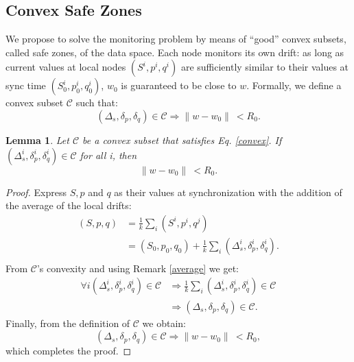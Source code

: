 \documentclass{sig-alternate-05-2015}
\newtheorem{lemma}{Lemma}
\begin{document}
\subsection{Convex Safe Zones}
We propose to solve the monitoring problem by means of
``good'' convex subsets, called safe zones, of the data space.
Each node monitors its own drift: as long as current values
at local nodes $(S^i,p^i,q^i)$ are sufficiently similar to their values
at sync time $(S^i_0,p^i_0,q^i_0)$, $w_0$ is guaranteed to be close to $w$.
Formally, we define a convex subset $\mathcal{C}$ such that:
\begin{equation} \label{convex}
(\Delta_s, \delta_p, \delta_q) \in \mathcal{C} \Rightarrow \parallel w-w_0
\parallel \ < R_0.
\end{equation}
\begin{lemma}
Let $\mathcal{C}$ be a convex subset that satisfies Eq. \ref{convex}.
If $(\Delta_s^i, \delta_p^i, \delta_q^i) \in \mathcal{C}$ for all i, then
\begin{equation*}
\parallel w-w_0 \parallel \ < R_0.
\end{equation*}
\end{lemma}
\begin{proof}
Express $S, p$ and $q$ as their values at synchronization with the addition of the
average of the local drifts:
\begin{equation*} 
\begin{split}
(S,p,q) & = \frac{1}{k} \sum_i (S^i,p^i,q^j) \\
 & = (S_0,p_0,q_0) + \frac{1}{k} \sum_i (\Delta_s^i,\delta^i_p,\delta_q^i). \\
\end{split}
\end{equation*}
From $\mathcal{C}$'s convexity and using Remark \ref{average} we get:
\begin{equation*} 
\begin{split}
\forall i (\Delta_s^i,\delta^i_p,\delta_q^i) \in \mathcal{C} & \Rightarrow 
\frac{1}{k} \sum_i (\Delta_s^i,\delta^i_p,\delta_q^i) \in \mathcal{C} \\
& \Rightarrow (\Delta_s,\delta_p,\delta_q) \in \mathcal{C}.
\end{split}
\end{equation*}
Finally, from the definition of $\mathcal{C}$ we obtain:
\begin{equation*}
(\Delta_s,\delta_p,\delta_q) \in \mathcal{C} \Rightarrow \parallel w-w_0
\parallel \ < R_0,
\end{equation*}
which completes the proof.
\end{proof}
\end{document}
